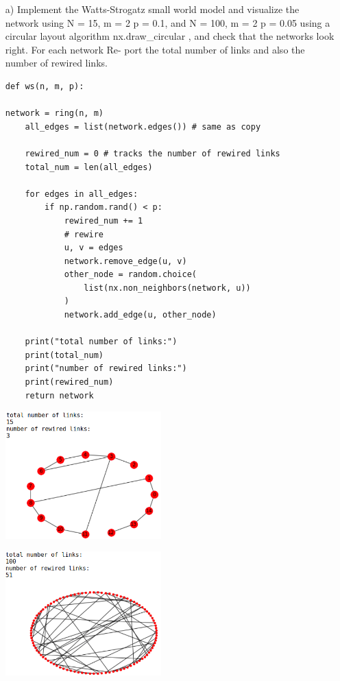 \documentclass[a4paper,12pt]{article}
\begin{document}
\begin{itemize}
\item[a) ] Implement the Watts-Strogatz small world model and visualize the network
using N = 15, m = 2 p = 0.1, and N = 100, m = 2 p = 0.05 using a circular layout algorithm 
nx.draw\_circular , and check that the networks look right. For each network Re-
port the total number of links and also the number of rewired links.

\begin{lstlisting}
def ws(n, m, p):

network = ring(n, m)
    all_edges = list(network.edges()) # same as copy
    
    rewired_num = 0 # tracks the number of rewired links
    total_num = len(all_edges)
    
    for edges in all_edges:
        if np.random.rand() < p:
            rewired_num += 1
            # rewire
            u, v = edges
            network.remove_edge(u, v)
            other_node = random.choice(
                list(nx.non_neighbors(network, u))
            )
            network.add_edge(u, other_node)
            
    print("total number of links:")
    print(total_num)
    print("number of rewired links:")
    print(rewired_num)
    return network

\end{lstlisting}
\begin{minipage}{0.5\linewidth}
\centering
\includegraphics[width=6cm]{assets/rewire1.png}
\end{minipage}\hfill
\begin{minipage}{0.5\linewidth}
\centering
\includegraphics[width=6cm]{assets/rewire2.png}
\end{minipage}


\end{itemize}
\end{document}
